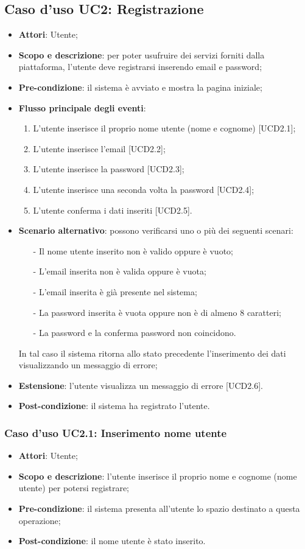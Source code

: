 \newpage
\subsection{Caso d'uso UC2: Registrazione}
\begin{itemize}
\item \textbf{Attori}: Utente;
\item \textbf{Scopo e descrizione}: per poter usufruire dei servizi forniti dalla piattaforma, l'utente deve registrarsi inserendo email e password;
\item \textbf{Pre-condizione}: il sistema è avviato e mostra la pagina iniziale;
\item \textbf{Flusso principale degli eventi}:
	\begin{enumerate}
	\item L'utente inserisce il proprio nome utente (nome e cognome) [UCD2.1];
	\item L'utente inserisce l'email [UCD2.2];
	\item L'utente inserisce la password [UCD2.3];
	\item L'utente inserisce una seconda volta la password [UCD2.4];
	\item L'utente conferma i dati inseriti [UCD2.5].
	\end{enumerate}
\item \textbf{Scenario alternativo}: possono verificarsi uno o più dei seguenti scenari:
	\begin{itemize}
	\item[-] Il nome utente inserito non è valido oppure è vuoto;
	\item[-] L'email inserita non è valida oppure è vuota;
	\item[-] L'email inserita è già presente nel sistema;
	\item[-] La password inserita è vuota oppure non è di almeno 8 caratteri;
	\item[-] La password e la conferma password non coincidono.
	\end{itemize}
In tal caso il sistema ritorna allo stato precedente l'inserimento dei dati visualizzando un messaggio di errore;
\item \textbf{Estensione}: l'utente visualizza un messaggio di errore [UCD2.6].
\item \textbf{Post-condizione}: il sistema ha registrato l'utente.
\end{itemize}

\subsubsection{Caso d'uso UC2.1: Inserimento nome utente}
\begin{itemize}
\item \textbf{Attori}: Utente;
\item \textbf{Scopo e descrizione}: l'utente inserisce il proprio nome e cognome (nome utente) per potersi registrare;
\item \textbf{Pre-condizione}: il sistema presenta all'utente lo spazio destinato a questa operazione;
\item \textbf{Post-condizione}: il nome utente è stato inserito.
\end{itemize}

